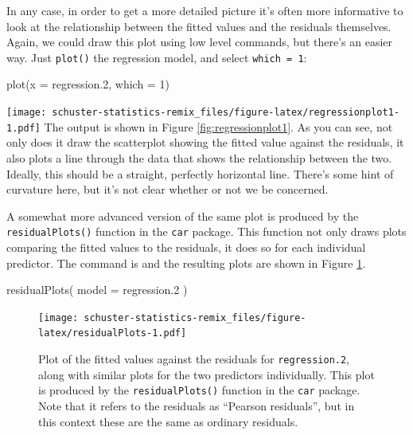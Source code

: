 \documentclass[
]{book}
\newenvironment{Shaded}{\begin{snugshade}}{\end{snugshade}}
\newcommand{\AttributeTok}[1]{\textcolor[rgb]{0.77,0.63,0.00}{#1}}
\newcommand{\DecValTok}[1]{\textcolor[rgb]{0.00,0.00,0.81}{#1}}
\newcommand{\FloatTok}[1]{\textcolor[rgb]{0.00,0.00,0.81}{#1}}
\newcommand{\FunctionTok}[1]{\textcolor[rgb]{0.00,0.00,0.00}{#1}}
\newcommand{\NormalTok}[1]{#1}
\begin{document}
In any case, in order to get a more detailed picture it's often more informative to look at the relationship between the fitted values and the residuals themselves. Again, we could draw this plot using low level commands, but there's an easier way. Just \texttt{plot()} the regression model, and select \texttt{which\ =\ 1}:

\begin{Shaded}
\begin{Highlighting}[]
\FunctionTok{plot}\NormalTok{(}\AttributeTok{x =}\NormalTok{ regression}\FloatTok{.2}\NormalTok{, }\AttributeTok{which =} \DecValTok{1}\NormalTok{)}
\end{Highlighting}
\end{Shaded}

\texttt{[image: schuster-statistics-remix\_files/figure-latex/regressionplot1-1.pdf]}
The output is shown in Figure \ref{fig:regressionplot1}. As you can see, not only does it draw the scatterplot showing the fitted value against the residuals, it also plots a line through the data that shows the relationship between the two. Ideally, this should be a straight, perfectly horizontal line. There's some hint of curvature here, but it's not clear whether or not we be concerned.

A somewhat more advanced version of the same plot is produced by the \texttt{residualPlots()} function in the \texttt{car} package. This function not only draws plots comparing the fitted values to the residuals, it does so for each individual predictor. The command is and the resulting plots are shown in Figure \ref{fig:residualPlots}.

\begin{Shaded}
\begin{Highlighting}[]
\FunctionTok{residualPlots}\NormalTok{( }\AttributeTok{model =}\NormalTok{ regression}\FloatTok{.2}\NormalTok{ ) }
\end{Highlighting}
\end{Shaded}

\begin{figure}
\centering
\texttt{[image: schuster-statistics-remix\_files/figure-latex/residualPlots-1.pdf]}
\caption{\label{fig:residualPlots}Plot of the fitted values against the residuals for \texttt{regression.2}, along with similar plots for the two predictors individually. This plot is produced by the \texttt{residualPlots()} function in the \texttt{car} package. Note that it refers to the residuals as ``Pearson residuals'', but in this context these are the same as ordinary residuals.}
\end{figure}
\end{document}
